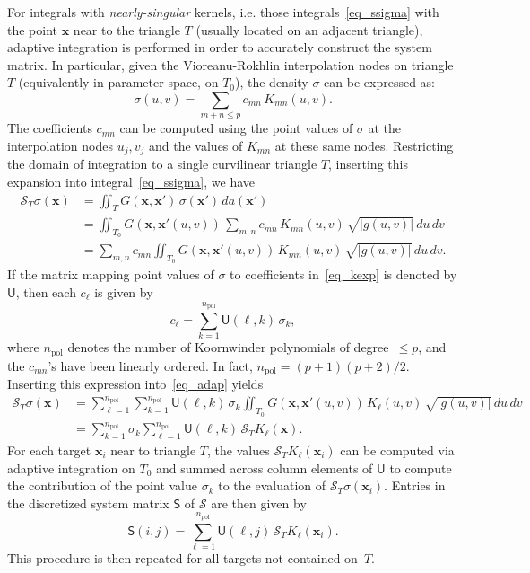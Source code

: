 \documentclass[11pt]{article}
\newcommand{\mtx}[1]{\bm{\mathsf{#1}}}
\newcommand{\entry}[1]{{\mathsf{#1}}}
\newcommand{\bx}{\bm x}
\newcommand{\cS}{\mathcal S}
\newcommand{\npol}{n_{\text{pol}}}
\numberwithin{equation}{section}
\begin{document}
For integrals with \emph{nearly-singular} kernels, i.e. those
integrals~\eqref{eq_ssigma}
with the point $\bx$ near to the triangle $T$ (usually located on an
adjacent triangle), adaptive integration is
performed in order to accurately construct the system matrix.
In particular, given the Vioreanu-Rokhlin interpolation nodes 
on triangle $T$ (equivalently in parameter-space, on $T_0$),
the density $\sigma$ can be expressed as:
\begin{equation}\label{eq_kexp}
\sigma(u,v) = \sum_{m+n\leq p} c_{mn} \, K_{mn}(u,v).
\end{equation}
The coefficients $c_{mn}$ can be computed using
the point values of $\sigma$ at the
interpolation nodes $u_j,v_j$ and the values of $K_{mn}$ at these same
nodes. Restricting the domain of integration
to a single curvilinear triangle $T$, inserting this expansion into
integral~\eqref{eq_ssigma}, we have
\begin{equation}\label{eq_adap}
  \begin{aligned}
    \cS_T \sigma(\bx) &= \iint_T G(\bx,\bx') \, 
    \sigma(\bx') \, da(\bx') \\
    &= \iint_{T_0} G(\bx,\bx'(u,v)) \, 
     \sum_{m,n} c_{mn} \, 
    K_{mn}(u,v) \,  
    \sqrt{|g(u,v)|} \, du \, dv \\
    &= \sum_{m,n} c_{mn} \iint_{T_0} 
    G(\bx,\bx'(u,v)) \, K_{mn}(u,v) \, 
    \sqrt{|g(u,v)|} \, du \, dv.
 \end{aligned}
\end{equation}
If the matrix mapping point values of $\sigma$ to coefficients
in~\eqref{eq_kexp} is denoted by $\mtx{U}$, then each $c_\ell$ is
given by
\begin{equation}
c_\ell = \sum_{k=1}^{\npol} \entry{U}(\ell,k) \, \sigma_k,
\end{equation}
where $\npol$ denotes the number of Koornwinder polynomials of
degree~$\leq p$, and the $c_{mn}$'s have been linearly ordered.
In fact, $\npol = (p+1)(p+2)/2$.
Inserting this expression into~\eqref{eq_adap} yields
\begin{equation}
  \begin{aligned}
    \cS_T \sigma(\bx) &= \sum_{\ell=1}^{\npol} 
    \sum_{k=1}^{\npol} \entry{U}(\ell,k) \, \sigma_k \iint_{T_0} 
    G(\bx,\bx'(u,v)) \, K_\ell(u,v)  \, 
    \sqrt{|g(u,v)|} \, du \, dv \\
    &= \sum_{k=1}^{\npol} \sigma_k 
    \sum_{\ell=1}^{\npol} \entry{U}(\ell,k) \, \cS_T K_\ell(\bx).
 \end{aligned}
\end{equation}
For each target $\bx_i$ near to triangle $T$, the values 
$\cS_T K_\ell(\bx_i)$ can be computed via adaptive integration
on $T_0$ and
summed across column elements of $\mtx{U}$ to compute the contribution
of the point value $\sigma_k$ to the evaluation of $\cS_T\sigma
(\bx_i)$.
Entries in the discretized system matrix $\mtx{S}$ of $\cS$ are
then given by
\begin{equation}
\entry{S}(i,j) = \sum_{\ell = 1}^{\npol} \entry{U}(\ell,j) \, \cS_T
K_\ell(\bx_i).
\end{equation}
This procedure is then repeated for all targets not contained on~$T$.
\end{document}

